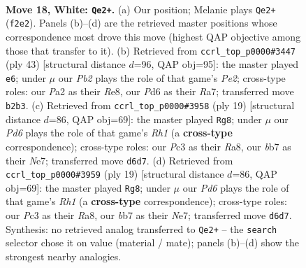 \documentclass[11pt]{article}
\begin{document}
\clearpage

\begin{figure}[p]\centering
\begin{subfigure}{0.46\textwidth}\centering
\resizebox{\linewidth}{!}{%
\newchessgame
\chessboard[
  setfen={2r1kbnr/1b3pp1/pq1P4/2p3Pp/2p2P1P/2P4R/PP3Q2/RNB1K2B w Qk - 0 18},
  showmover=false,
  pgfstyle=straightmove, color=movearrow, markmove={f2-e2}
]}
\caption{}
\end{subfigure}\hfill
\begin{subfigure}{0.46\textwidth}\centering
\resizebox{\linewidth}{!}{%
\newchessgame
\chessboard[
  setfen={2b1r1k1/r3pp1p/ppn2qpB/2p5/P7/1BPR3P/1KP1QPP1/4R3 b - - 5 22},
  showmover=false,
  pgfstyle=straightmove, color=movearrow, markmove={e7-e6}
]}
\caption{}
\end{subfigure}
\\[4pt]
\begin{subfigure}{0.46\textwidth}\centering
\resizebox{\linewidth}{!}{%
\newchessgame
\chessboard[
  setfen={rnb1k2r/p1ppnp1p/1p6/3P2pq/4Pp2/2Q5/PPP3PP/R1B1KBNR b kq - 0 10},
  showmover=false,
  pgfstyle=straightmove, color=movearrow, markmove={h8-g8}
]}
\caption{}
\end{subfigure}\hfill
\begin{subfigure}{0.46\textwidth}\centering
\resizebox{\linewidth}{!}{%
\newchessgame
\chessboard[
  setfen={rnb1k2r/p1ppnp1p/1p6/3P2pq/4Pp2/2Q5/PPP3PP/R1B1KBNR b kq - 0 10},
  showmover=false,
  pgfstyle=straightmove, color=movearrow, markmove={h8-g8}
]}
\caption{}
\end{subfigure}
\caption{\textbf{Move 18, White: \texttt{Qe2+}.} (a) Our position; Melanie plays \texttt{Qe2+} (\texttt{f2e2}). Panels (b)--(d) are the retrieved master positions whose correspondence most drove this move (highest QAP objective among those that transfer to it). (b) Retrieved from \texttt{ccrl\_top\_p0000\#3447} (ply 43) [structural distance $d$=96, QAP obj=95]: the master played \texttt{e6}; under $\mu$ our \emph{Pb2} plays the role of that game's \emph{Pe2}; cross-type roles: our \emph{P}a2 as their \emph{R}e8, our \emph{P}d6 as their \emph{R}a7; transferred move \texttt{b2b3}. (c) Retrieved from \texttt{ccrl\_top\_p0000\#3958} (ply 19) [structural distance $d$=86, QAP obj=69]: the master played \texttt{Rg8}; under $\mu$ our \emph{Pd6} plays the role of that game's \emph{Rh1} (a \textbf{cross-type} correspondence); cross-type roles: our \emph{P}c3 as their \emph{R}a8, our \emph{b}b7 as their \emph{N}e7; transferred move \texttt{d6d7}. (d) Retrieved from \texttt{ccrl\_top\_p0000\#3959} (ply 19) [structural distance $d$=86, QAP obj=69]: the master played \texttt{Rg8}; under $\mu$ our \emph{Pd6} plays the role of that game's \emph{Rh1} (a \textbf{cross-type} correspondence); cross-type roles: our \emph{P}c3 as their \emph{R}a8, our \emph{b}b7 as their \emph{N}e7; transferred move \texttt{d6d7}. Synthesis: no retrieved analog transferred to \texttt{Qe2+} -- the \texttt{search} selector chose it on value (material / mate); panels (b)--(d) show the strongest nearby analogies.}
\label{fig:thought-m34}
\end{figure}
\end{document}
